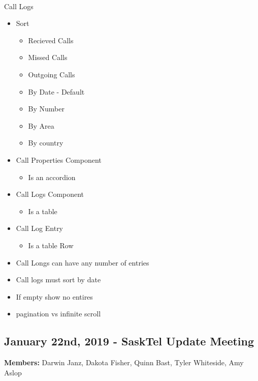 \documentclass[12pt]{article}
\begin{document}
\paragraph{} 
Call Logs
\begin{itemize}
	\item Sort
	\begin{itemize}
		\item Recieved Calls
		\item Missed Calls
		\item Outgoing Calls
		\item By Date - Default
		\item By Number
		\item By Area
		\item By country
	\end{itemize}
	\item Call Properties Component
	\begin{itemize}
		\item Is an accordion
	\end{itemize}
	\item Call Logs Component
	\begin{itemize}
		\item Is a table
	\end{itemize}
	\item Call Log Entry
	\begin{itemize}
		\item Is a table Row
	\end{itemize}
	\item Call Longs can have any number of entries
	\item Call logs must sort by date
	\item If empty show no entires
	\item pagination vs infinite scroll
\end{itemize}

\subsection{January 22nd, 2019 - SaskTel Update Meeting}
\textbf{Members:} Darwin Janz, Dakota Fisher, Quinn Bast, Tyler Whiteside, Amy Aslop
\paragraph{} 
\end{document}
